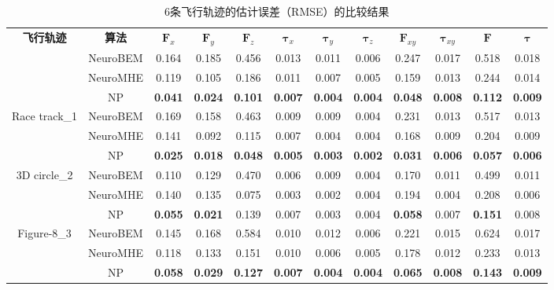 \documentclass[lang=chs, degree=master, blindreview=true, winfonts=true]{yanputhesis}
\begin{document}
\renewcommand\arraystretch{1.15}  %
\begin{table}[h]
\centering
\caption{6条飞行轨迹的估计误差（RMSE）的比较结果}
\label{table_bem}
\setlength{\tabcolsep}{4pt}  %
\begin{tabular}{c c c c c c c c c c c c}
	\Xhline{1.pt}
	\textbf{飞行轨迹} & \textbf{算法} & $\bm F_x$ & $\bm F_y$ & $\bm F_z$ & $\bm \tau_x$ & $\bm \tau_y$ & $\bm \tau_z$ & $\bm F_{xy}$ & $\bm \tau_{xy}$ & $\bm F$ & $\bm \tau$ \\
	\Xhline{1.pt}
	\multirow{3}{*}{Linear oscillation} & NeuroBEM & 0.164 & 0.185 & 0.456 & 0.013 & 0.011 & 0.006 & 0.247 & 0.017 & 0.518 & 0.018 \\
	& NeuroMHE & 0.119 & 0.105 & 0.186 & 0.011 & 0.007 & 0.005 & 0.159 & 0.013 & 0.244 & 0.014 \\
	& NP & \textbf{0.041} & \textbf{0.024} & \textbf{0.101} & \textbf{0.007} & \textbf{0.004} & \textbf{0.004} & \textbf{0.048} & \textbf{0.008} & \textbf{0.112} & \textbf{0.009} \\
	\hline
	\multirow{3}{*}{Race track\_1} & NeuroBEM & 0.169 & 0.158 & 0.463 & 0.009 & 0.009 & 0.004 & 0.231 & 0.013 & 0.517 & 0.013 \\
	& NeuroMHE & 0.141 & 0.092 & 0.115 & 0.007 & 0.004 & 0.004 & 0.168 & 0.009 & 0.204 & 0.009 \\
	& NP & \textbf{0.025} & \textbf{0.018} & \textbf{0.048} & \textbf{0.005} & \textbf{0.003} & \textbf{0.002} & \textbf{0.031} & \textbf{0.006} & \textbf{0.057} & \textbf{0.006} \\
	\hline
	\multirow{3}{*}{3D circle\_2} & NeuroBEM & 0.110 & 0.129 & 0.470 & 0.006 & 0.009 & 0.004 & 0.170 & 0.011 & 0.499 & 0.011 \\
	& NeuroMHE & 0.140 & 0.135 & 0.075 & 0.003 & 0.002 & 0.004 & 0.194 & 0.004 & 0.208 & 0.006 \\
	& NP & \textbf{0.055} & \textbf{0.021} & 0.139 & 0.007 & 0.003 & 0.004 & \textbf{0.058} & 0.007 & \textbf{0.151} & 0.008 \\
	\hline
	\multirow{3}{*}{Figure-8\_3} & NeuroBEM & 0.145 & 0.168 & 0.584 & 0.010 & 0.012 & 0.006 & 0.221 & 0.015 & 0.624 & 0.017 \\
	& NeuroMHE & 0.118 & 0.133 & 0.151 & 0.010 & 0.006 & 0.005 & 0.178 & 0.012 & 0.233 & 0.013 \\
	& NP & \textbf{0.058} & \textbf{0.029} & \textbf{0.127} & \textbf{0.007} & \textbf{0.004} & \textbf{0.004} & \textbf{0.065} & \textbf{0.008} & \textbf{0.143} & \textbf{0.009} \\

\end{tabular}
\end{table}
\end{document}
